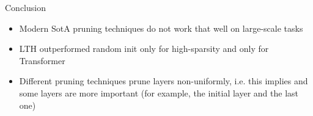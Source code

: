 \documentclass[handout, 10pt]{beamer}
\begin{document}
\begin{frame}{Conclusion}
    \begin{itemize}
        \item Modern SotA pruning techniques do not work that well on large-scale tasks
        \item LTH outperformed random init only for high-sparsity and only for Transformer
        \item Different pruning techniques prune layers non-uniformly, i.e. this implies and some layers are more important (for example, the initial layer and the last one)
    \end{itemize}
\end{frame}
\end{document}
